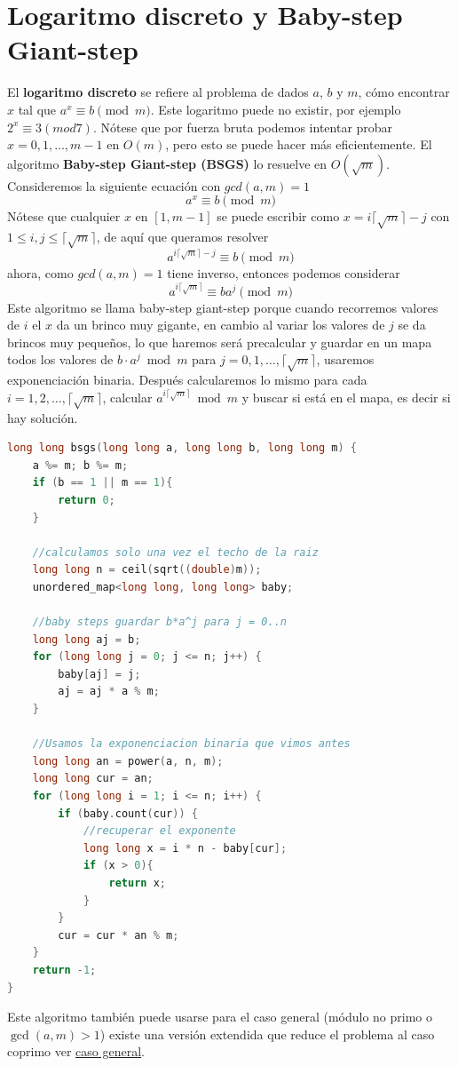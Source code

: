 \section{Logaritmo discreto y Baby-step Giant-step}
El \textbf{logaritmo discreto} se refiere al problema de dados $a$, $b$ y $m$, cómo encontrar $x$ tal que $a^x \equiv b \pmod{m}$. Este logaritmo puede no existir, por ejemplo $2^x\equiv 3 (mod 7)$. Nótese que por fuerza bruta podemos intentar probar $x = 0, 1, \ldots, m-1$ en $O(m)$, pero esto se puede hacer más eficientemente. El algoritmo \textbf{Baby-step Giant-step (BSGS)} lo resuelve en $O(\sqrt{m})$.
\\Consideremos la siguiente ecuación con $gcd(a,m)=1$
\[a^x \equiv b \pmod{m}\]
Nótese que cualquier $x$ en $[1,m-1]$ se puede escribir como $x=i\lceil \sqrt{m} \rceil - j $ con $1\leq i,j \leq \lceil \sqrt{m} \rceil$, de aquí que queramos resolver
\[a^{i\lceil \sqrt{m} \rceil - j} \equiv b \pmod{m}\]
 ahora, como $gcd(a,m)=1$ tiene inverso, entonces podemos considerar 
 \[a^{i\lceil \sqrt{m} \rceil} \equiv ba^{j} \pmod{m}\]
Este algoritmo se llama baby-step giant-step porque cuando recorremos valores de $i$ el $x$ da un brinco muy gigante, en cambio al variar los valores de $j$ se da brincos muy pequeños, lo que haremos será precalcular y guardar en un mapa todos los valores de $b \cdot a^j \bmod m$ para $j = 0, 1, \ldots, \lceil\sqrt{m}\rceil$, usaremos exponenciación binaria. Después calcularemos lo mismo para cada $i = 1, 2, \ldots, \lceil\sqrt{m}\rceil$, calcular $a^{i\lceil\sqrt{m}\rceil} \bmod m$ y buscar si está en el mapa, es decir si hay solución.
 
\begin{lstlisting}[language=C++]
long long bsgs(long long a, long long b, long long m) {
    a %= m; b %= m;
    if (b == 1 || m == 1){
        return 0;
    }
    
    //calculamos solo una vez el techo de la raiz 
    long long n = ceil(sqrt((double)m));
    unordered_map<long long, long long> baby;
 
    //baby steps guardar b*a^j para j = 0..n
    long long aj = b;
    for (long long j = 0; j <= n; j++) {
        baby[aj] = j;
        aj = aj * a % m;
    }
 
    //Usamos la exponenciacion binaria que vimos antes
    long long an = power(a, n, m);
    long long cur = an;
    for (long long i = 1; i <= n; i++) {
        if (baby.count(cur)) {
            //recuperar el exponente 
            long long x = i * n - baby[cur];
            if (x > 0){
                return x;
            }
        }
        cur = cur * an % m;
    }
    return -1;
}
\end{lstlisting}
Este algoritmo también puede usarse para el caso general (módulo no primo o $\gcd(a,m) > 1$) existe una versión extendida que reduce el problema al caso coprimo ver \href{https://cp-algorithms.com/algebra/discrete-log.html#when-a-and-m-are-not-coprime}{caso general}.
 
